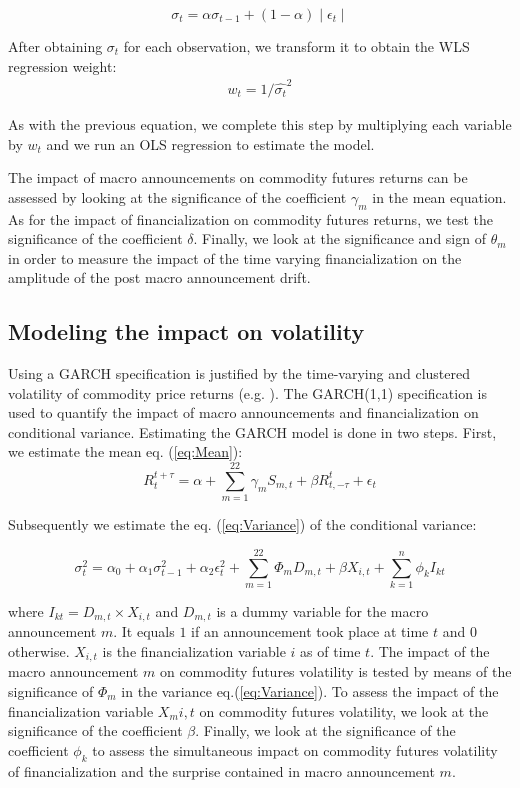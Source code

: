\documentclass[12pt]{article}
\begin{document}
\begin{equation}\label{eq:auxiliary 2}
\sigma_t=\alpha \sigma_{t-1}+(1-\alpha) \mid \epsilon_t \mid 
\end{equation} 

After obtaining  $\sigma_t$ for each observation, we transform it to obtain the WLS regression weight:
\begin{align*}
w_t=1/\hat{\sigma_t}^2
\end{align*}

As with the previous equation, we complete this step by multiplying each variable by  $w_t$ and we run an OLS regression to estimate the model.%

 The impact of macro announcements on commodity futures returns  can be assessed by looking at the significance of the coefficient $\gamma_m$ in the mean equation. As for the impact of financialization on commodity futures returns, we test the significance of the coefficient $\delta$. Finally, we look at the significance and sign of $\theta_m$ in order to measure the impact of the time varying financialization on the amplitude of the post macro announcement drift.
 
\subsection{Modeling the impact on volatility}\label{variance}
Using a GARCH specification is justified by the time-varying and clustered volatility of commodity price returns (e.g. \citep{hammoudeh2008metal}).
The GARCH(1,1) specification is used to quantify the impact of macro announcements and financialization on conditional variance. Estimating the GARCH model is done in two steps. First, we estimate the mean eq. (\ref{eq:Mean}):
\begin{equation}\label{eq:Mean}R_{t}^{t+\tau}=\alpha+\sum_{m=1}^{22} \gamma_m S_{m,t}+\beta R_{t,-\tau}^{t}+\epsilon_{t}
\end{equation}

Subsequently we estimate the eq. (\ref{eq:Variance}) of the conditional variance:

\begin{equation}\label{eq:Variance}
\sigma_{t}^2=\alpha_0+\alpha_1 \sigma_{t-1}^2+\alpha_2 \epsilon_t^2 +\sum_{m=1}^{22} \Phi_m D_{m,t}+\beta X_{i,t}+\sum_{k=1}^n \phi_k I_{kt}
\end{equation}

where $I_{kt}=D_{m,t} \times X_{i,t}$ and $D_{m,t}$ is a dummy variable for the macro announcement $m$. It equals $1$ if an announcement took place at time $t$ and 0 otherwise. $X_{i,t}$  is the financialization variable $i$ as of time $t$. The impact of the macro announcement $m$ on commodity futures volatility is tested by means of the significance of $\Phi_m$ in the variance eq.(\ref{eq:Variance}). To assess the impact of the financialization variable $X_m{i,t}$ on commodity futures volatility, we look at the significance of the coefficient $\beta$. Finally, we look at the significance of the coefficient $\phi_k$ to assess the simultaneous impact on commodity futures volatility of  financialization  and the surprise contained in macro announcement $m$. 
\end{document}
